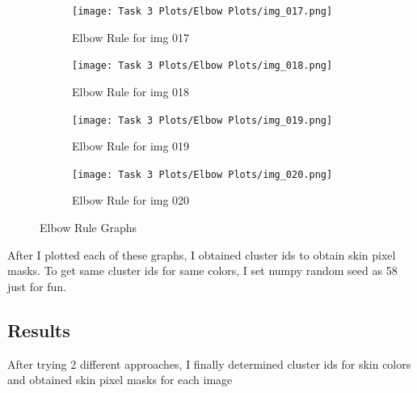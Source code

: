 \documentclass[11pt]{report}
\begin{document}
\begin{figure}[H]
    \begin{subfigure}{0.3\textwidth}
        \centering
        \texttt{[image: Task 3 Plots/Elbow Plots/img\_017.png]}
        \caption{Elbow Rule for img 017}
        \label{fig:elbow17}
    \end{subfigure}
    \begin{subfigure}{0.3\textwidth}
        \centering
        \texttt{[image: Task 3 Plots/Elbow Plots/img\_018.png]}
        \caption{Elbow Rule for img 018}
        \label{fig:elbow18}
    \end{subfigure}
    \begin{subfigure}{0.3\textwidth}
        \centering
        \texttt{[image: Task 3 Plots/Elbow Plots/img\_019.png]}
        \caption{Elbow Rule for img 019}
        \label{fig:elbow19}
    \end{subfigure}
    \begin{subfigure}{0.3\textwidth}
        \centering
        \texttt{[image: Task 3 Plots/Elbow Plots/img\_020.png]}
        \caption{Elbow Rule for img 020}
        \label{fig:elbow20}
    \end{subfigure}
    \caption{Elbow Rule Graphs}
    \label{fig:elbowall}
\end{figure}

After I plotted each of these graphs, I obtained cluster ids to obtain skin pixel masks. To get same cluster ids for same colors, I set numpy random seed as 58 just for fun.

\subsection{Results}

After trying 2 different approaches, I finally determined cluster ids for skin colors and obtained skin pixel masks for each image
\end{document}

